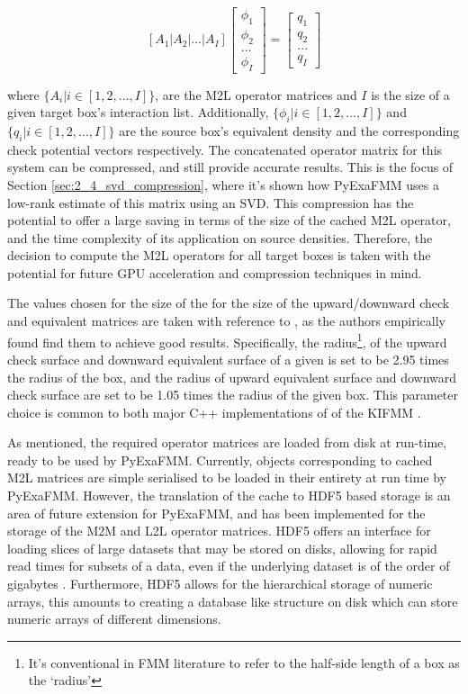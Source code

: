 \begin{equation}
    \left [ A_1 | A_2 | ... | A_I \right] \begin{bmatrix} \phi_1 \\ \phi_2 \\  ... \\  \phi_I \end{bmatrix} = \begin{bmatrix} q_1\\ q_2\\  ... \\  q_I \end{bmatrix}
\end{equation}

where $\{A_i | i \in [1, 2, ..., I]\}$, are the M2L operator matrices and $I$ is the size of a given
target box's interaction list. Additionally, $\{\phi_i | i \in [1,2, ..., I]\}$ and $\{q_i | i \in [1,2, ..., I]\}$
are the source box's equivalent density and the corresponding check potential vectors
respectively. The concatenated operator matrix for this system can be compressed, and still
provide accurate results. This is the focus of Section \ref{sec:2_4_svd_compression},
where it's shown how \gls{PyExaFMM} uses a low-rank estimate of this matrix using
an \gls{SVD}. This compression has the potential to offer a large saving in terms
of the size of the cached M2L operator, and the time complexity of its application
on source densities. Therefore, the decision to compute the \gls{M2L} operators for
all target boxes is taken with the potential for future GPU acceleration and
compression techniques in mind.

The values chosen for the size of the for the size of the upward/downward
check and equivalent matrices are taken with reference to \cite{Malhotra:2015:CCP},
as the authors empirically found find them to achieve good results. Specifically,
the radius\footnote{It's conventional in FMM literature to refer to the half-side
length of a box as the `radius'}, of the upward check surface and downward equivalent
surface of a given is set to be 2.95 times the radius of the box, and the radius of
upward equivalent surface and downward check surface are set to be 1.05 times the radius
of the given box. This parameter choice is common to both major C++ implementations of
of the \gls{KIFMM} \cite{exafmm,Malhotra:2015:CCP}.

As mentioned, the required operator matrices are loaded from disk at run-time, ready to
be used by \gls{PyExaFMM}. Currently, objects corresponding to cached \gls{M2L}
matrices are simple serialised to be loaded in their entirety at run time by
\gls{PyExaFMM}. However, the translation of the cache to HDF5 based storage is
an area of future extension for \gls{PyExaFMM}, and has been implemented
for the storage of the \gls{M2M} and \gls{L2L} operator matrices. HDF5 offers an
interface for loading slices of large datasets that may be stored on disks, allowing
for rapid read times for subsets of a data, even if the underlying dataset
is of the order of gigabytes \cite{Wasser:NSF}. Furthermore, HDF5 allows for the
hierarchical storage of numeric arrays, this amounts to creating
a database like structure on disk which can store numeric arrays of different
dimensions.

